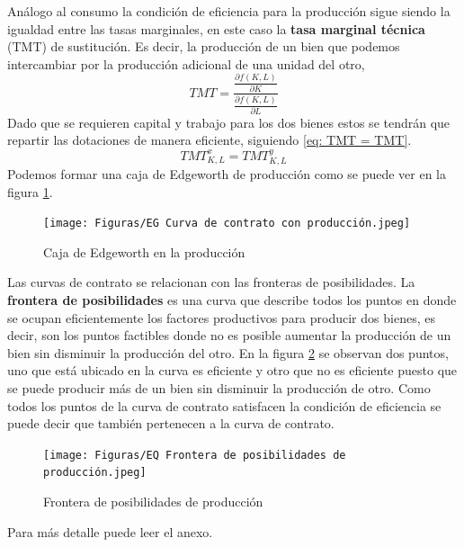 Análogo al consumo la condición de eficiencia para la producción sigue siendo la igualdad entre las tasas marginales, en este caso la \textbf{tasa marginal técnica} (TMT) de sustitución. Es decir, la producción de un bien que podemos intercambiar por la producción adicional de una unidad del otro,
\begin{equation}
    TMT = \frac{ \frac{\partial f(K,L)}{\partial K} }{\frac{\partial f(K,L)}{\partial L} } \label{eq: TMT dfn}
\end{equation}
Dado que se requieren capital y trabajo para los dos bienes estos se tendrán que repartir las dotaciones de manera eficiente, siguiendo \ref{eq: TMT = TMT}.
\begin{equation}
    TMT^x_{K,L} = TMT^y_{K,L} \label{eq: TMT = TMT}
\end{equation}
Podemos formar una caja de Edgeworth de producción como se puede ver en la figura \ref{fig:diapositiva4}.
\begin{figure}[h]
    \centering
    \caption{Caja de Edgeworth en la producción}
    \texttt{[image: Figuras/EG Curva de contrato con producción.jpeg]}
    \label{fig:diapositiva4}
\end{figure}
Las curvas de contrato se relacionan con las fronteras de posibilidades. La \textbf{frontera de posibilidades} es una curva que describe todos los puntos en donde se ocupan eficientemente los factores productivos para producir dos bienes, es decir, son los puntos factibles donde no es posible aumentar la producción de un bien sin disminuir la producción del otro. En la figura \ref{fig:diapositiva5} se observan dos puntos, uno que está ubicado en la curva es eficiente y otro que no es eficiente puesto que se puede producir más de un bien sin disminuir la producción de otro. Como todos los puntos de la curva de contrato satisfacen la condición de eficiencia se puede decir que también pertenecen a la curva de contrato.
\begin{figure}[h]
    \centering
    \caption{Frontera de posibilidades de producción}
    \texttt{[image: Figuras/EQ Frontera de posibilidades de producción.jpeg]}
    \label{fig:diapositiva5}
\end{figure}
Para más detalle puede leer el anexo.